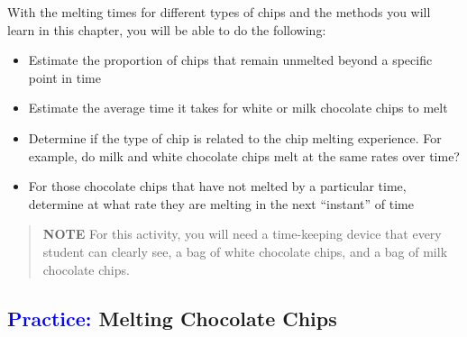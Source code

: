 \documentclass[
]{report}
\providecommand{\tightlist}{%
  \setlength{\itemsep}{0pt}\setlength{\parskip}{0pt}}
\begin{document}
With the melting times for different types of chips and the methods you will learn in this chapter, you will be able to do the following:

\begin{itemize}
\tightlist
\item
  Estimate the proportion of chips that remain unmelted beyond a specific point in time\\
\item
  Estimate the average time it takes for white or milk chocolate chips to melt\\
\item
  Determine if the type of chip is related to the chip melting experience. For example, do milk and white chocolate chips melt at the same rates over time?\\
\item
  For those chocolate chips that have not melted by a particular time, determine at what rate they are melting in the next ``instant'' of time
\end{itemize}

\begin{quote}
\textbf{NOTE}
For this activity, you will need a time-keeping device that every student can clearly see, a bag of white chocolate chips, and a bag of milk chocolate chips.
\end{quote}

\hypertarget{melting-chocolate-chips}{%
\subsection*{\texorpdfstring{\textcolor{blue}{Practice:} Melting Chocolate Chips}{ Melting Chocolate Chips}}\label{melting-chocolate-chips}}
\end{document}

